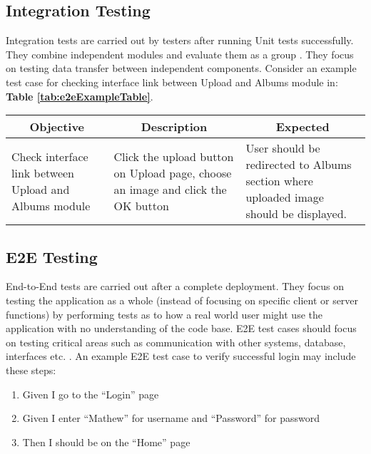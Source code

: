 \subsection{Integration Testing}
\label{subsec:unit-testing}

Integration tests are carried out by testers after running Unit tests successfully. They combine independent modules and evaluate them as a group \cite{search-software-quality}. They focus on testing data transfer between independent components. Consider an example test case for checking interface link between Upload and Albums module in:  \textbf{Table \ref{tab:e2eExampleTable}}.

\begin{center}
\begin{tabular}{ |p{4cm}|p{4cm}|p{4cm}|  }

 \hline
 	\multicolumn{1}{|c|}{Objective} &
 	\multicolumn{1}{|c|}{Description} &
 	\multicolumn{1}{|c|}{Expected}  \\
 \hline
 	Check interface link between Upload and Albums module & Click the upload button on Upload page, choose an image and click the OK button & User should be redirected to Albums section where uploaded image should be displayed. \\
 \hline

\end{tabular}
\label{tab:e2eExampleTable}
\end{center}

\subsection{E2E Testing}
\label{subsec:e2e-testing}

End-to-End tests are carried out after a complete deployment. They focus on testing the application as a whole (instead of focusing on specific client or server functions) by performing tests as to how a real world user might use the application with no understanding of the code base. E2E test cases should focus on testing critical areas such as communication with other systems, database, interfaces etc. \cite{tutorialspoint}. An example E2E test case to verify successful login may include these steps:

\begin{enumerate}
	\item Given I go to the “Login” page
    \item Given I enter “Mathew” for username and “Password” for password
    \item Then I should be on the “Home” page
\end{enumerate}


